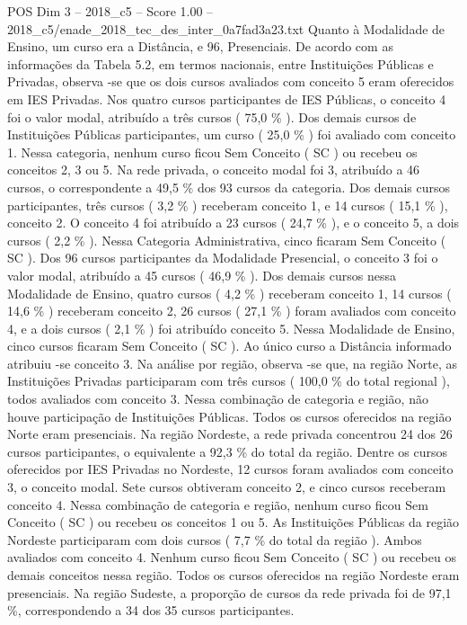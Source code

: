 \begin{textsample}{POS Dim 3 – 2018\_c5 – Score 1.00 – 2018\_c5/enade\_2018\_tec\_des\_inter\_0a7fad3a23.txt}
Quanto à Modalidade de Ensino, um curso era a Distância, e 96, Presenciais.
De acordo com as informações da Tabela 5.2, em termos nacionais, entre Instituições Públicas e Privadas, observa -se que os dois cursos avaliados com conceito 5 eram oferecidos em IES Privadas.
Nos quatro cursos participantes de IES Públicas, o conceito 4 foi o valor modal, atribuído a três cursos ( 75,0 \% ).
Dos demais cursos de Instituições Públicas participantes, um curso ( 25,0 \% ) foi avaliado com conceito 1.
Nessa categoria, nenhum curso ficou Sem Conceito ( SC ) ou recebeu os conceitos 2, 3 ou 5.
Na rede privada, o conceito modal foi 3, atribuído a 46 cursos, o correspondente a 49,5 \% dos 93 cursos da categoria.
Dos demais cursos participantes, três cursos ( 3,2 \% ) receberam conceito 1, e 14 cursos ( 15,1 \% ), conceito 2.
O conceito 4 foi atribuído a 23 cursos ( 24,7 \% ), e o conceito 5, a dois cursos ( 2,2 \% ).
Nessa Categoria Administrativa, cinco ficaram Sem Conceito ( SC ).
Dos 96 cursos participantes da Modalidade Presencial, o conceito 3 foi o valor modal, atribuído a 45 cursos ( 46,9 \% ).
Dos demais cursos nessa Modalidade de Ensino, quatro cursos ( 4,2 \% ) receberam conceito 1, 14 cursos ( 14,6 \% ) receberam conceito 2, 26 cursos ( 27,1 \% ) foram avaliados com conceito 4, e a dois cursos ( 2,1 \% ) foi atribuído conceito 5.
Nessa Modalidade de Ensino, cinco cursos ficaram Sem Conceito ( SC ).
Ao único curso a Distância informado atribuiu -se conceito 3.
Na análise por região, observa -se que, na região Norte, as Instituições Privadas participaram com três cursos ( 100,0 \% do total regional ), todos avaliados com conceito 3.
Nessa combinação de categoria e região, não houve participação de Instituições Públicas.
Todos os cursos oferecidos na região Norte eram presenciais.
Na região Nordeste, a rede privada concentrou 24 dos 26 cursos participantes, o equivalente a 92,3 \% do total da região.
Dentre os cursos oferecidos por IES Privadas no Nordeste, 12 cursos foram avaliados com conceito 3, o conceito modal.
Sete cursos obtiveram conceito 2, e cinco cursos receberam conceito 4.
Nessa combinação de categoria e região, nenhum curso ficou Sem Conceito ( SC ) ou recebeu os conceitos 1 ou 5.
As Instituições Públicas da região Nordeste participaram com dois cursos ( 7,7 \% do total da região ).
Ambos avaliados com conceito 4.
Nenhum curso ficou Sem Conceito ( SC ) ou recebeu os demais conceitos nessa região.
Todos os cursos oferecidos na região Nordeste eram presenciais.
Na região Sudeste, a proporção de cursos da rede privada foi de 97,1 \%, correspondendo a 34 dos 35 cursos participantes.

\end{textsample}
